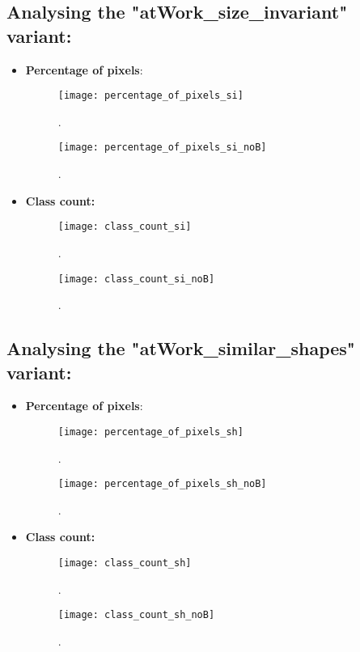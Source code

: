 \documentclass[paper=a4,11pt,parskip=half,toc=listof]{scrartcl}
\begin{document}
	\subsection{Analysing the "atWork\_size\_invariant" variant:}
	
		\begin{itemize}
			\item \textbf{Percentage of pixels}: 
			
			\begin{figure}[!htb]
			\centering
				\texttt{[image: percentage\_of\_pixels\_si]}
				\caption{.}
				\label{Fig:14}
			\end{figure}
			
			\begin{figure}[!htb]
			\centering
				\texttt{[image: percentage\_of\_pixels\_si\_noB]}
				\caption{.}
				\label{Fig:15}
			\end{figure}
			
			\item \textbf{Class count:} 
			
			\begin{figure}[!htb]
			\centering
				\texttt{[image: class\_count\_si]}
				\caption{.}
				\label{Fig:16}
			\end{figure}
			
			\begin{figure}[!htb]
			\centering
				\texttt{[image: class\_count\_si\_noB]}
				\caption{.}
				\label{Fig:17}
			\end{figure}
		\end{itemize}
		
	\subsection{Analysing the "atWork\_similar\_shapes" variant:}
	
		\begin{itemize}
			\item \textbf{Percentage of pixels}: 
			
			\begin{figure}[!htb]
			\centering
				\texttt{[image: percentage\_of\_pixels\_sh]}
				\caption{.}
				\label{Fig:18}
			\end{figure}
			
			\begin{figure}[!htb]
			\centering
				\texttt{[image: percentage\_of\_pixels\_sh\_noB]}
				\caption{.}
				\label{Fig:19}
			\end{figure}
			
			\item \textbf{Class count:} 
			
			\begin{figure}[!htb]
			\centering
				\texttt{[image: class\_count\_sh]}
				\caption{.}
				\label{Fig:20}
			\end{figure}
			
			\begin{figure}[!htb]
			\centering
				\texttt{[image: class\_count\_sh\_noB]}
				\caption{.}
				\label{Fig:21}
			\end{figure}
		\end{itemize}
		
\end{document}
